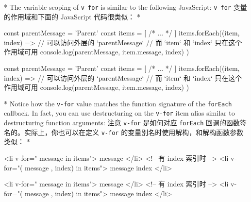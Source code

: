 \begin{paracol}{2}
\switchcolumn[0]*%
The variable scoping of \texttt{v-for} is similar to the following
JavaScript:
\switchcolumn
\texttt{v-for} 变量的作用域和下面的 JavaScript 代码很类似：
\switchcolumn[0]*%
\begin{codeJs}
const parentMessage = 'Parent'
const items = [
  /* ... */
]
items.forEach((item, index) => {
  // 可以访问外层的 `parentMessage`
  // 而 `item` 和 `index` 只在这个作用域可用
  console.log(parentMessage, item.message, index)
})
\end{codeJs}
\switchcolumn
\begin{codeJs}
const parentMessage = 'Parent'
const items = [
  /* ... */
]
items.forEach((item, index) => {
  // 可以访问外层的 `parentMessage`
  // 而 `item` 和 `index` 只在这个作用域可用
  console.log(parentMessage, item.message, index)
})
\end{codeJs}
\switchcolumn[0]*%
Notice how the \texttt{v-for} value matches the function signature of
the \texttt{forEach} callback. In fact, you can use destructuring on the
\texttt{v-for} item alias similar to destructuring function arguments:
\switchcolumn
注意 \texttt{v-for} 是如何对应 \texttt{forEach}
回调的函数签名的。实际上，你也可以在定义 \texttt{v-for}
的变量别名时使用解构，和解构函数参数类似：
\switchcolumn[0]*%
\begin{codeHtml}
<li v-for="{ message } in items">
  {{ message }}
</li>
<!-- 有 index 索引时 -->
<li v-for="({ message }, index) in items">
  {{ message }} {{ index }}
</li>
\end{codeHtml}
\switchcolumn
\begin{codeHtml}
<li v-for="{ message } in items">
  {{ message }}
</li>
<!-- 有 index 索引时 -->
<li v-for="({ message }, index) in items">
  {{ message }} {{ index }}
</li>
\end{codeHtml}


\end{paracol}
